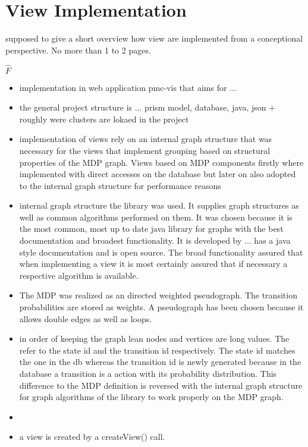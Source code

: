 \documentclass[preview]{standalone}
\begin{document}
\section{View Implementation}
supposed to give a short overview how view are implemented from a conceptional perspective. No more than 1 to 2 pages.

\noindent$\hat{F}$
\begin{itemize}
	\item implementation in web application pmc-vis that aims for ...
	\item the general project structure is ... prism model, database, java, json + roughly were clusters are lokaed in the project
	\item implementation of views rely on an internal graph structure that was necessary for the views that implement grouping based on structural properties of the MDP graph. Views based on MDP components firstly where implemented with direct accesses on the database but later on also adopted to the internal graph structure for performance reasons
	\item internal graph structure the \jgrapht library was used. It supplies graph structures as well as common algorithms performed on them. It was chosen because it is the most common, most up to date java library for graphs with the best documentation and broadest functionality. It is developed by ... has a java style documentation and is open source. The broad functionality assured that when implementing a view it is most certainly assured that if necessary a respective algorithm is available.
	\item The MDP was realized as an directed weighted pseudograph. The transition probabilities are stored as weights. A pseudograph has been chosen because it allows double edges as well as loops.
	\item in order of keeping the graph lean nodes and vertices are long values. The refer to the state id and the transition id respectively. The state id matches the one in the db whereas the transition id is newly generated because in the database a transition is a action with its probability distribution. This difference to the MDP definition is reversed with the internal graph structure for graph algorithms of the \jgrapht library to work properly on the MDP graph.
	\item {}
	\item a view is created by a createView() call. 

\end{itemize}
\end{document}
